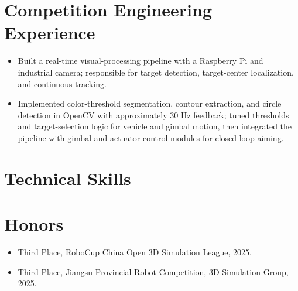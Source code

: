 \documentclass[10pt]{article}
\begin{document}
\section{Competition Engineering Experience}\color{black}
\begin{itemize}
  \item Built a real-time visual-processing pipeline with a Raspberry Pi and industrial camera; responsible for target detection, target-center localization, and continuous tracking.
  \item Implemented color-threshold segmentation, contour extraction, and circle detection in OpenCV with approximately 30 Hz feedback; tuned thresholds and target-selection logic for vehicle and gimbal motion, then integrated the pipeline with gimbal and actuator-control modules for closed-loop aiming.
\end{itemize}

\section{Technical Skills}\color{black}

\section{Honors}\color{black}
\begin{itemize}
  \item Third Place, RoboCup China Open 3D Simulation League, 2025.
  \item Third Place, Jiangsu Provincial Robot Competition, 3D Simulation Group, 2025.
\end{itemize}
\end{document}
